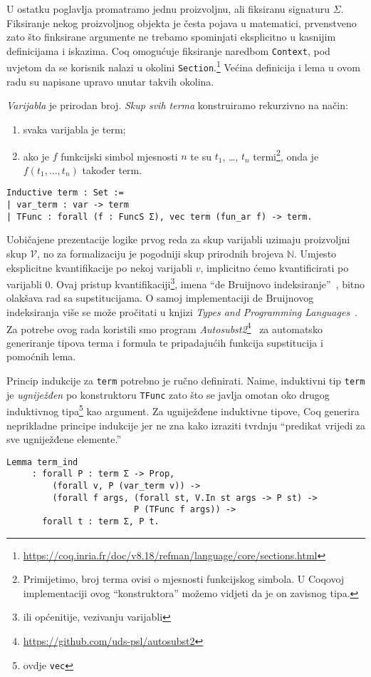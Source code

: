 \noindent U ostatku poglavlja promatramo jednu proizvoljnu, ali fiksiranu signaturu \(\Sigma\).
Fiksiranje nekog proizvoljnog objekta je česta pojava u matematici,
prvenstveno zato što finksirane argumente ne trebamo spominjati eksplicitno u kasnijim definicijama i iskazima.
Coq omogućuje fiksiranje naredbom \texttt{Context},
pod uvjetom da se korisnik nalazi u okolini \texttt{Section}.\footnote{\url{https://coq.inria.fr/doc/v8.18/refman/language/core/sections.html}}
Većina definicija i lema u ovom radu su napisane upravo unutar takvih okolina.

\begin{definition}\label{def:term}
  \textit{Varijabla} je prirodan broj. \textit{Skup svih terma} konstruiramo rekurzivno na način:
  \begin{enumerate}
  \item svaka varijabla je term;
  \item ako je \(f\) funkcijski simbol mjesnosti \(n\) te su \(t_{1}\), \ldots, \(t_{n}\) termi\footnote{Primijetimo, broj terma ovisi o mjesnosti funkcijskog simbola. U Coqovoj implementaciji ovog \enquote{konstruktora} možemo vidjeti da je on zavisnog tipa.},
    onda je \(f(t_{1}, \ldots, t_{n})\) također term.
  \end{enumerate}
\begin{verbatim}
Inductive term : Set :=
| var_term : var -> term 
| TFunc : forall (f : FuncS Σ), vec term (fun_ar f) -> term.
\end{verbatim}
\end{definition}
\noindent Uobičajene prezentacije logike prvog reda za
skup varijabli uzimaju proizvoljni skup \(\mathcal{V}\),
no za formalizaciju je pogodniji skup prirodnih brojeva \(\mathbb{N}\).
Umjesto eksplicitne kvantifikacije po nekoj varijabli \(v\),
implicitno ćemo kvantificirati po varijabli \(0\).
Ovaj pristup kvantifikaciji\footnote{ili općenitije, vezivanju varijabli},
imena \enquote{de Bruijnovo indeksiranje}~\cite{debruijnamelessdummies},
bitno olakšava rad sa supstitucijama.
O samoj implementaciji de Bruijnovog indeksiranja više se može pročitati u knjizi
\textit{Types and Programming Languages}~\cite{pierce2002tapl}.
Za potrebe ovog rada koristili smo program \textit{Autosubst2}\footnote{\url{https://github.com/uds-psl/autosubst2}}~\cite{stark-phd,autosubst2}
za automatsko generiranje tipova terma i formula te pripadajućih funkcija supstitucija i pomoćnih lema.

Princip indukcije za \texttt{term} potrebno je ručno definirati.
Naime, induktivni tip \texttt{term} je \textit{ugniježđen} po konstruktoru \texttt{TFunc} zato što
se javlja omotan oko drugog induktivnog tipa\footnote{ovdje \texttt{vec}} kao argument.
Za ugniježđene induktivne tipove, Coq generira neprikladne principe indukcije jer ne zna
kako izraziti tvrdnju \enquote{predikat vrijedi za sve ugniježđene elemente.}
\begin{verbatim}
Lemma term_ind
     : forall P : term Σ -> Prop,
         (forall v, P (var_term v)) ->
         (forall f args, (forall st, V.In st args -> P st) ->
                         P (TFunc f args)) ->
       forall t : term Σ, P t.
\end{verbatim}

